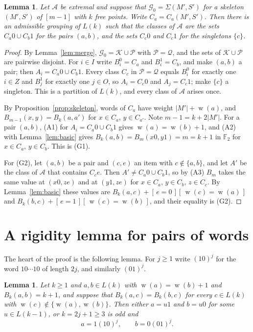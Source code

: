 \documentclass[11pt]{amsart}
\newtheorem{lemma}[theorem]{Lemma}
\theoremstyle{definition}
\theoremstyle{remark}
\numberwithin{equation}{section}
\newcommand{\F}{\mathbb{F}}
\newcommand{\cA}{\mathcal{A}}
\newcommand{\cG}{\mathcal{G}}
\newcommand{\cK}{\mathcal{K}}
\newcommand{\cP}{\mathcal{P}}
\newcommand{\cQ}{\mathcal{Q}}
\newcommand{\Iv}[1]{[\,#1\,]}
\DeclareMathOperator{\wt}{w}
\begin{document}
\begin{lemma}\label{lem:grouping}
Let $\cA$ be extremal and suppose that $\cG_0=\Sigma(M',S')$ for a skeleton $(M',S')$ of $[m-1]$ with $k$ free points. Write $C_a=C_a(M',S')$. Then there is an admissible grouping of $L(k)$ such that the classes of $\cA$ are the sets $C_a0\cup C_b1$ for the pairs $(a,b)$, and the sets $C_c0$ and $C_c1$ for the singletons $\{c\}$.
\end{lemma}

\begin{proof}
By Lemma~\ref{lem:merge}, $\cG_0=\cK\cup\cP$ with $\cP=\cQ$, and the sets of $\cK\cup\cP$ are pairwise disjoint. For $i\in I$ write $B_i^0=C_a$ and $B_i^1=C_b$, and make $(a,b)$ a pair; then $A_i=C_a0\cup C_b1$. Every class $C_c$ in $\cP=\cQ$ equals $B_i^0$ for exactly one $i\in Z$ and $B_j^1$ for exactly one $j\in O$, so $A_i=C_c0$ and $A_j=C_c1$; make $\{c\}$ a singleton. This is a partition of $L(k)$, and every class of $\cA$ arises once.

By Proposition~\ref{prop:skeleton}, words of $C_a$ have weight $|M'|+\wt(a)$, and $B_{m-1}(x,y)=B_k(a,a')$ for $x\in C_a$, $y\in C_{a'}$. Note $m-1=k+2|M'|$. For a pair $(a,b)$, (A1) for $A_i=C_a0\cup C_b1$ gives $\wt(a)=\wt(b)+1$, and (A2) with Lemma~\ref{lem:basic} gives $B_k(a,b)=B_m(x0,y1)=m=k+1$ in $\F_2$ for $x\in C_a$, $y\in C_b$. This is (G1).

For (G2), let $(a,b)$ be a pair and $(c,e)$ an item with $c\notin\{a,b\}$, and let $A'$ be the class of $\cA$ that contains $C_ce$. Then $A'\ne C_a0\cup C_b1$, so by (A3) $B_m$ takes the same value at $(x0,z e)$ and at $(y1,ze)$ for $x\in C_a$, $y\in C_b$, $z\in C_c$. By Lemma~\ref{lem:basic} these values are $B_k(a,c)+\Iv{e=0}\Iv{\wt(c)=\wt(a)}$ and $B_k(b,c)+\Iv{e=1}\Iv{\wt(c)=\wt(b)}$, and their equality is (G2).
\end{proof}

\section{A rigidity lemma for pairs of words}\label{sec:star}

The heart of the proof is the following lemma. For $j\ge1$ write $(10)^j$ for the word $10\cdots10$ of length $2j$, and similarly $(01)^j$.

\begin{lemma}\label{lem:star}
Let $k\ge1$ and $a,b\in L(k)$ with $\wt(a)=\wt(b)+1$ and $B_k(a,b)=k+1$, and suppose that $B_k(a,c)=B_k(b,c)$ for every $c\in L(k)$ with $\wt(c)\notin\{\wt(a),\wt(b)\}$. Then either $a=u1$ and $b=u0$ for some $u\in L(k-1)$, or $k=2j+1\ge3$ is odd and
\[
a=1(10)^j,\qquad b=0(01)^j .
\]
\end{lemma}
\end{document}
